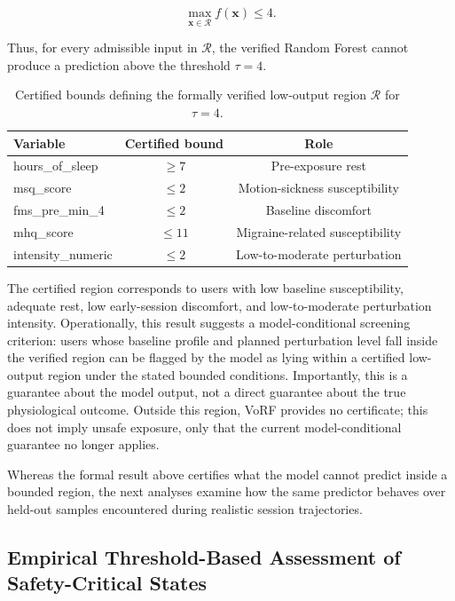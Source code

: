 \documentclass[review]{vgtc}              %
\begin{document}
\begin{equation}
\max_{\mathbf{x} \in \mathcal{R}} f(\mathbf{x}) \le 4 .
\end{equation}

Thus, for every admissible input in $\mathcal{R}$, the verified Random Forest cannot produce a prediction above the threshold $\tau = 4$.

\begin{table}[tb]
\centering
\caption{Certified bounds defining the formally verified low-output region $\mathcal{R}$ for $\tau = 4$.}
\scriptsize
\begin{tabular}{lcc}
\toprule
\textbf{Variable} & \textbf{Certified bound} & \textbf{Role} \\
\midrule
hours\_of\_sleep   & $\ge 7$  & Pre-exposure rest \\
msq\_score         & $\le 2$  & Motion-sickness susceptibility \\
fms\_pre\_min\_4   & $\le 2$  & Baseline discomfort \\
mhq\_score         & $\le 11$ & Migraine-related susceptibility \\
intensity\_numeric & $\le 2$  & Low-to-moderate perturbation \\
\bottomrule
\end{tabular}
\label{tab:formal_certificate}
\end{table}

The certified region corresponds to users with low baseline susceptibility, adequate rest, low early-session discomfort, and low-to-moderate perturbation intensity. Operationally, this result suggests a model-conditional screening criterion: users whose baseline profile and planned perturbation level fall inside the verified region can be flagged by the model as lying within a certified low-output region under the stated bounded conditions. Importantly, this is a guarantee about the model output, not a direct guarantee about the true physiological outcome. Outside this region, VoRF provides no certificate; this does not imply unsafe exposure, only that the current model-conditional guarantee no longer applies.

Whereas the formal result above certifies what the model cannot predict inside a bounded region, the next analyses examine how the same predictor behaves over held-out samples encountered during realistic session trajectories.

\subsection{Empirical Threshold-Based Assessment of Safety-Critical States}
\end{document}
